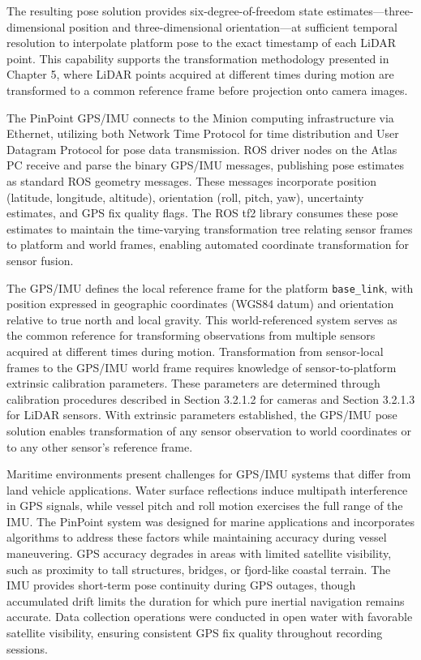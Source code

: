 \documentclass{erauthesis}
\begin{document}
The resulting pose solution provides six-degree-of-freedom state estimates—three-dimensional position and three-dimensional orientation—at sufficient temporal resolution to interpolate platform pose to the exact timestamp of each \ac{LiDAR} point.
This capability supports the transformation methodology presented in Chapter 5, where \ac{LiDAR} points acquired at different times during motion are transformed to a common reference frame before projection onto camera images.

The PinPoint \ac{GPS}/\ac{IMU} connects to the Minion computing infrastructure via Ethernet, utilizing both Network Time Protocol for time distribution and User Datagram Protocol for pose data transmission.
\ac{ROS} driver nodes on the Atlas PC receive and parse the binary \ac{GPS}/\ac{IMU} messages, publishing pose estimates as standard \ac{ROS} geometry messages.
These messages incorporate position (latitude, longitude, altitude), orientation (roll, pitch, yaw), uncertainty estimates, and \ac{GPS} fix quality flags.
The \ac{ROS} tf2 library consumes these pose estimates to maintain the time-varying transformation tree relating sensor frames to platform and world frames, enabling automated coordinate transformation for sensor fusion.

The \ac{GPS}/\ac{IMU} defines the local reference frame for the platform \texttt{base\_link}, with position expressed in geographic coordinates (WGS84 datum) and orientation relative to true north and local gravity.
This world-referenced system serves as the common reference for transforming observations from multiple sensors acquired at different times during motion.
Transformation from sensor-local frames to the \ac{GPS}/\ac{IMU} world frame requires knowledge of sensor-to-platform extrinsic calibration parameters.
These parameters are determined through calibration procedures described in Section 3.2.1.2 for cameras and Section 3.2.1.3 for \ac{LiDAR} sensors.
With extrinsic parameters established, the \ac{GPS}/\ac{IMU} pose solution enables transformation of any sensor observation to world coordinates or to any other sensor's reference frame.

Maritime environments present challenges for \ac{GPS}/\ac{IMU} systems that differ from land vehicle applications.
Water surface reflections induce multipath interference in \ac{GPS} signals, while vessel pitch and roll motion exercises the full range of the \ac{IMU}.
The PinPoint system was designed for marine applications and incorporates algorithms to address these factors while maintaining accuracy during vessel maneuvering.
\ac{GPS} accuracy degrades in areas with limited satellite visibility, such as proximity to tall structures, bridges, or fjord-like coastal terrain.
The \ac{IMU} provides short-term pose continuity during \ac{GPS} outages, though accumulated drift limits the duration for which pure inertial navigation remains accurate.
Data collection operations were conducted in open water with favorable satellite visibility, ensuring consistent \ac{GPS} fix quality throughout recording sessions.
\end{document}
